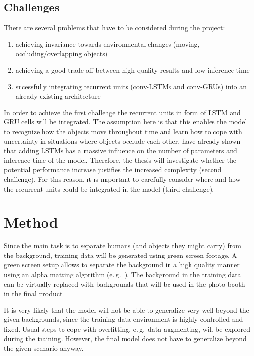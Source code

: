 \documentclass[11pt,
  paper=a4, 
  bibliography=totocnumbered,
	captions=tableheading,
	BCOR=10mm
]{scrreprt}
\theoremstyle{definition}
\newcommand{\eg}{e.\,g.~}
\begin{document}
\section{Challenges}

There are several problems that have to be considered during the project:
\begin{enumerate}
	\item achieving invariance towards environmental changes (moving, occluding/overlapping objects)
	\item achieving a good trade-off between high-quality results and low-inference time 
	\item sucessfully integrating recurrent units (conv-LSTMs and conv-GRUs) into an already existing architecture
\end{enumerate}

In order to achieve the first challenge the recurrent units in form of LSTM and GRU cells will be integrated.
The assumption here is that this enables the model to recognize how the objects move throughout time and learn how to cope with uncertainty in situations where objects occlude each other.
\textcite{Pfeuffer2019, Pfeuffer2_2019} have already shown that adding LSTMs has a massive influence on the number of parameters and inference time of the model.
Therefore, the thesis will investigate whether the potential performance increase justifies the increased complexity (second challenge).
For this reason, it is important to carefully consider where and how the recurrent units could be integrated in the model (third challenge).


\chapter{Method}
\label{sec:Method}

Since the main task is to separate humans (and objects they might carry) from the background, training data will be generated using green screen footage.
A green screen setup allows to separate the background in a high quality manner using an alpha matting algorithm (\eg \cite{Gastal2010}).
The background in the training data can be virtually replaced with backgrounds that will be used in the photo booth in the final product.

It is very likely that the model will not be able to generalize very well beyond the given backgrounds, since the training data environment is highly controlled and fixed.
Usual steps to cope with overfitting, \eg data augmenting, will be explored during the training.
However, the final model does not have to generalize beyond the given scenario anyway. 
\end{document}
